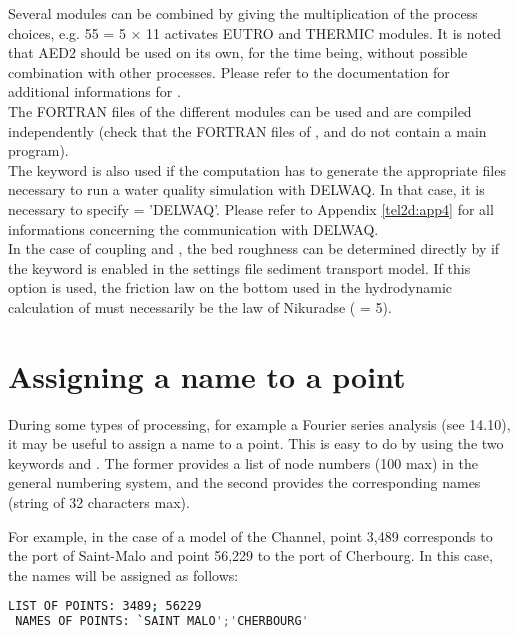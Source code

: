 Several modules can be combined by giving the multiplication of the process
choices, e.g. 55 = 5 $\times$ 11 activates EUTRO and THERMIC modules.
It is noted that AED2 should be used on its own, for the time being,
without possible combination with other processes.
Please refer to the \waqtel documentation for additional informations for
\waqtel.\\

The FORTRAN files of the different modules can be used and are compiled
independently (check that the FORTRAN files of \gaia, \sisyphe and \tomawac
do not contain a main program).\\

The keyword  is also used if the computation
has to generate the appropriate files necessary to run a water quality
simulation with DELWAQ.
In that case, it is necessary to specify  = 'DELWAQ'.
Please refer to Appendix \ref{tel2d:app4} for all informations concerning
the communication with DELWAQ.\\

In the case of coupling  and \sisyphe, the bed roughness can be
determined directly by \sisyphe if the keyword
 is enabled in the settings file
sediment transport model.
If this option is used, the friction law on the bottom used
in the hydrodynamic calculation of  must necessarily be
the law of Nikuradse ( = 5).


\section{Assigning a name to a point}

During some types of processing, for example a Fourier series analysis
(see 14.10),
it may be useful to assign a name to a point.
This is easy to do by using the two keywords 
and .
The former provides a list of node numbers (100 max) in the general numbering
system,
and the second provides the corresponding names (string of 32 characters max).

For example, in the case of a model of the Channel, point 3,489 corresponds
to the port of Saint-Malo and point 56,229 to the port of Cherbourg.
In this case, the names will be assigned as follows:
\begin{lstlisting}[language=bash]
 LIST OF POINTS: 3489; 56229
 NAMES OF POINTS: `SAINT MALO';'CHERBOURG'
\end{lstlisting}

